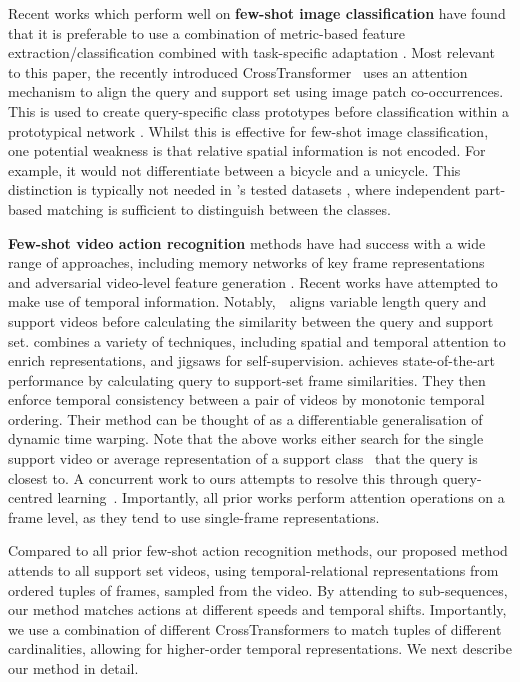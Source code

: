 \documentclass[final]{cvpr}
\begin{document}
Recent works which perform well on \textbf{few-shot image classification} have found that it is preferable to use a combination of metric-based feature extraction/classification combined with task-specific adaptation \cite{Requeima2019, Bateni2020}.
Most relevant to this paper, the recently introduced CrossTransformer~\cite{Doersch2020} uses an attention mechanism to align the query and support set using image patch co-occurrences.  This is used to create query-specific class prototypes before classification within a prototypical network \cite{Snell2017}. Whilst this is effective for few-shot image classification, one potential weakness is that relative spatial information is not encoded. For example, it would not differentiate between a bicycle and a unicycle. 
This distinction is typically not needed in \cite{Doersch2020}'s tested datasets \cite{triantafillou2019metadataset}, where independent part-based matching is sufficient to distinguish between the classes.



\textbf{Few-shot video action recognition} methods have had success with a wide range of approaches, including memory networks of key frame representations~\cite{Zhu2018,Zhu2020} and
adversarial video-level feature generation \cite{Dwivedi2019}.
Recent works have attempted to make use of temporal information. Notably,~\cite{Bishay2019}~aligns variable length query and support videos before calculating the similarity between the query and support set.
\cite{Zhang2020} combines a variety of techniques, including spatial and temporal attention to enrich representations, and jigsaws for self-supervision.  \cite{Cao2020} achieves state-of-the-art performance by calculating query to support-set frame similarities.  They then enforce temporal consistency between a pair of videos by monotonic temporal ordering.  Their method can be thought of as a differentiable generalisation of dynamic time warping.
Note that the above works either search for the single support video \cite{Zhang2020} or average representation of a support class~\cite{Bishay2019,Cao2020} that the query is closest to.
A concurrent work to ours attempts to resolve this through query-centred learning~\cite{Zhu2021}.
Importantly, all prior works perform attention operations on a frame level, as they tend to use single-frame representations. 



Compared to all prior few-shot action recognition methods, 
our proposed method attends to all support set videos, using temporal-relational representations from ordered tuples of frames, sampled from the video. By attending to sub-sequences, our method matches actions at different speeds and temporal shifts. Importantly, we use a combination of different CrossTransformers to match tuples of different cardinalities, allowing for higher-order temporal representations. We next describe our method in detail.  
\end{document}
